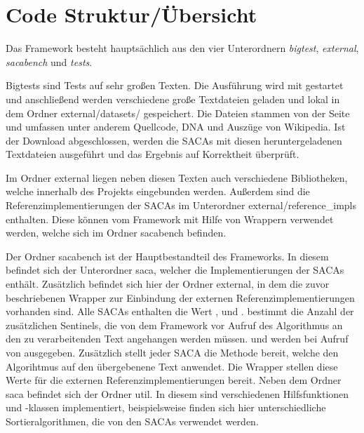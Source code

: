 \section{Code Struktur/Übersicht}
\label{sec:code-structure}
Das  Framework besteht hauptsächlich aus den vier Unterordnern \textit{bigtest}, \textit{external}, \textit{sacabench} und \textit{tests}. \par
Bigtests sind Tests auf sehr großen Texten.
Die Ausführung wird mit  gestartet und anschließend werden verschiedene große Textdateien geladen und lokal in dem Ordner external/datasets/ gespeichert. 
Die Dateien stammen von der Seite  und umfassen unter anderem Quellcode, DNA und Auszüge von Wikipedia.
Ist der Download abgeschlossen, werden die SACAs mit diesen heruntergeladenen Textdateien ausgeführt und das Ergebnis auf Korrektheit überprüft. \par
Im Ordner external liegen neben diesen Texten auch verschiedene Bibliotheken, welche innerhalb des Projekts eingebunden werden.
Außerdem sind die Referenzimplementierungen der SACAs im Unterordner external/reference\_impls enthalten. 
Diese können vom Framework mit Hilfe von Wrappern verwendet werden, welche sich im Ordner sacabench befinden. \par
Der Ordner sacabench ist der Hauptbestandteil des Frameworks. 
In diesem befindet sich der Unterordner saca, welcher die Implementierungen der SACAs enthält. 
Zusätzlich befindet sich hier der Ordner external, in dem die zuvor beschriebenen Wrapper zur Einbindung der externen Referenzimplementierungen vorhanden sind. 
Alle SACAs enthalten die Wert ,  und . 
 bestimmt die Anzahl der zusätzlichen Sentinels, die von dem Framework vor Aufruf des Algorithmus an den zu verarbeitenden Text angehangen werden müssen. 
 und  werden bei Aufruf von  ausgegeben. 
Zusätzlich stellt jeder SACA die Methode  bereit, welche den Algorihtmus auf den übergebenene Text anwendet. 
Die Wrapper stellen diese Werte für die externen Referenzimplementierungen bereit.
Neben dem Ordner saca befindet sich der Ordner util. 
In diesem sind verschiedenen Hilfsfunktionen und -klassen implementiert, beispielsweise finden sich hier unterschiedliche Sortieralgorithmen, die von den SACAs verwendet werden. 

